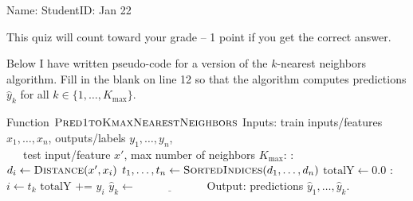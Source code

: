 \documentclass{article}[12pt]
\begin{document}
\thispagestyle{empty}


Name: \underline{\hspace{2in}} StudentID: \underline{\hspace{2in}} Jan 22

This quiz will count toward your grade -- 1 point if you get the
correct answer.

Below I have written pseudo-code for a version of the $k$-nearest
neighbors algorithm. Fill in the blank on line 12 so that the
algorithm computes predictions $\hat y_k$ for all
$k\in\{1,\dots, K_{\text{max}}\}$.

\begin{algorithmic}[1]
  \State Function $\textsc{Pred1toKmaxNearestNeighbors}$
  \State Inputs: train inputs/features $x_1,\dots,x_n$, outputs/labels $y_1,\dots,y_n$,\\ \ \ \ test input/feature $x'$, max number of neighbors $K_{\text{max}}$:
  :
  \State $d_i\gets \textsc{Distance}(x', x_i)$
  \EndFor
  \State $t_1,\dots,t_n\gets \textsc{SortedIndices}(d_1,\dots,d_n)$
  \State $\text{totalY}\gets 0.0$
  :
  \State $i\gets t_k$
  \State $\text{totalY} \texttt{ += } y_i$
  \State $\hat y_k\gets \underline{\hspace{1in}}$
  \EndFor
  \State Output: predictions $\hat y_1, \dots, \hat y_k$.
\end{algorithmic}
\end{document}
